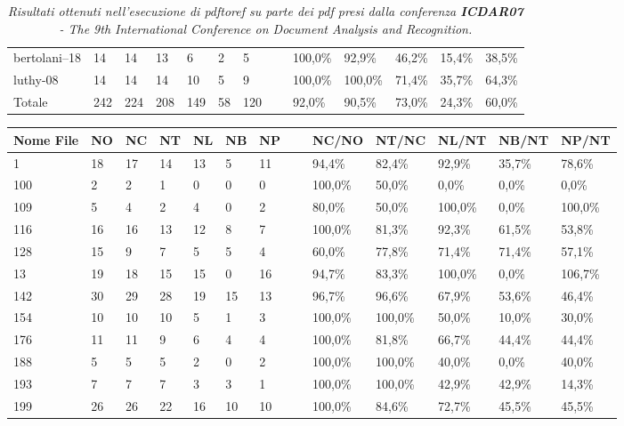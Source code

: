 \begin{table}
\begin{center}
\begin{tabular}{|l|l|l|l|l|l|l|l|l|l|l|l|l|}
bertolani--18 & 14 & 14 & 13 & 6 & 2 & 5 & ~ & 100,0\% & 92,9\% & 46,2\% & 15,4\% & 38,5\%\\
luthy-08 & 14 & 14 & 14 & 10 & 5 & 9 & ~ & 100,0\% & 100,0\% & 71,4\% & 35,7\% & 64,3\%\\ \hline
Totale & 242 & 224 & 208 & 149 & 58 & 120 & ~ & 92,0\% & 90,5\% & 73,0\% & 24,3\% & 60,0\%\\ \hline
	\end{tabular}
	\end{center}
	\tiny{\caption{\textit{Risultati ottenuti nell'esecuzione di pdftoref su parte dei pdf presi dalla conferenza \textbf{ICDAR07} - The 9th International Conference on Document Analysis and Recognition.} }}
		\label{tab:icdar}
	\end{table}

	\begin{table}\label{tab:grec}
	\begin{center}
	\begin{tabular}{|l|l|l|l|l|l|l|l|l|l|l|l|l|} \hline
Nome File & NO & NC & NT & NL & NB & NP & ~ & NC/NO & NT/NC & NL/NT & NB/NT & NP/NT \\ \hline
1 & 18 & 17 & 14 & 13 & 5 & 11 & ~ & 94,4\% & 82,4\% & 92,9\% & 35,7\% & 78,6\%\\
100 & 2 & 2 & 1 & 0 & 0 & 0 & ~ & 100,0\% & 50,0\% & 0,0\% & 0,0\% & 0,0\%\\
109 & 5 & 4 & 2 & 4 & 0 & 2 & ~ & 80,0\% & 50,0\% & 100,0\% & 0,0\% & 100,0\%\\
116 & 16 & 16 & 13 & 12 & 8 & 7 & ~ & 100,0\% & 81,3\% & 92,3\% & 61,5\% & 53,8\%\\
128 & 15 & 9 & 7 & 5 & 5 & 4 & ~ & 60,0\% & 77,8\% & 71,4\% & 71,4\% & 57,1\%\\
13 & 19 & 18 & 15 & 15 & 0 & 16 & ~ & 94,7\% & 83,3\% & 100,0\% & 0,0\% & 106,7\%\\
142 & 30 & 29 & 28 & 19 & 15 & 13 & ~ & 96,7\% & 96,6\% & 67,9\% & 53,6\% & 46,4\%\\
154 & 10 & 10 & 10 & 5 & 1 & 3 & ~ & 100,0\% & 100,0\% & 50,0\% & 10,0\% & 30,0\%\\
176 & 11 & 11 & 9 & 6 & 4 & 4 & ~ & 100,0\% & 81,8\% & 66,7\% & 44,4\% & 44,4\%\\
188 & 5 & 5 & 5 & 2 & 0 & 2 & ~ & 100,0\% & 100,0\% & 40,0\% & 0,0\% & 40,0\%\\
193 & 7 & 7 & 7 & 3 & 3 & 1 & ~ & 100,0\% & 100,0\% & 42,9\% & 42,9\% & 14,3\%\\
199 & 26 & 26 & 22 & 16 & 10 & 10 & ~ & 100,0\% & 84,6\% & 72,7\% & 45,5\% & 45,5\%\\

\end{tabular}
\end{center}
\end{table}
